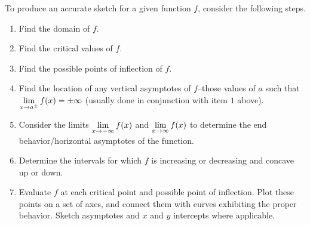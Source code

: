 {To produce an accurate sketch for a given function $f$, consider the following steps.
\begin{enumerate}[1)]
\item Find the domain of $f$. %
\item Find the critical values of $f$.
\item Find the possible points of inflection of $f$.
\item Find the location of any vertical asymptotes of $f$--those values of $a$ such that $\displaystyle \lim_{x \to a^{\pm}} f(x) = \pm \infty$ (usually done in conjunction with item $1$ above).
\item Consider the limits $\displaystyle\lim_{x\to-\infty}f(x)$ and $\displaystyle\lim_{x\to\infty}f(x)$ to determine the end behavior/horizontal asymptotes of the function.
\item Determine the intervals for which $f$ is increasing or decreasing and concave up or down.
\item Evaluate $f$ at each critical point and possible point of inflection. Plot these points on a set of axes, and connect them with curves exhibiting the proper behavior. Sketch asymptotes and $x$ and $y$ intercepts where applicable.
\end{enumerate}
} %

